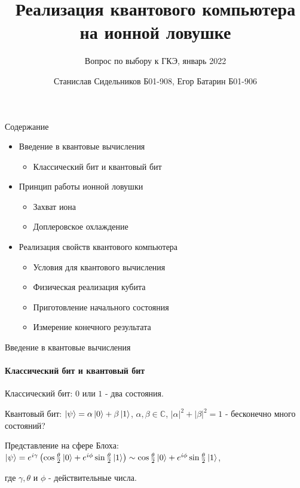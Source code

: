 \documentclass{beamer}
\title{Реализация квантового компьютера на ионной ловушке}
\subtitle{Вопрос по выбору к ГКЭ, январь 2022}
\author{Станислав Сидельников Б01-908, Егор Батарин Б01-906}
\institute{Московский физико-технический институт}
\date{}
\begin{document}
    
    \begin{frame}
        \titlepage
    \end{frame}

    \begin{frame}{Содержание}

        \begin{itemize}

            \item<1-> Введение в квантовые вычисления

                \begin{itemize}
                    \item Классический бит и квантовый бит
                \end{itemize}

            \item<2-> Принцип работы ионной ловушки

                \begin{itemize}
                    \item{Захват иона}
                    \item{Доплеровское охлаждение}
                \end{itemize}

            \item<3-> Реализация свойств квантового компьютера

                \begin{itemize}

                    \item{Условия для квантового вычисления}
                    \item{Физическая реализация кубита}
                    \item{Приготовление начального состояния}
                    \item{Измерение конечного результата}

                \end{itemize}

        \end{itemize}
    \end{frame}

	\begin{frame}{Введение в квантовые вычисления}
	\framesubtitle{Классический бит и квантовый бит}
	Классический бит: $0$ или $1$ - два состояния.
	\vspace{3mm}
	
	Квантовый бит: $\ket{\psi} = \alpha\ket{0} + \beta\ket{1}$, $\alpha,\beta \in \mathbb{C}$, $|\alpha|^2 + |\beta|^2 = 1$ - бесконечно много состояний?
	\vspace{3mm}
	
	Представление на сфере Блоха: $\ket{\psi} = e^{i\gamma}\left(  \cos{\frac{\theta}{2}}\ket{0}+e^{i\phi}\sin{\frac{\theta}{2}} \ket{1}  \right) \sim \cos{\frac{\theta}{2}}\ket{0}+e^{i\phi}\sin{\frac{\theta}{2}} \ket{1} $,
	
	где $\gamma, \theta$ и $\phi$ - действительные числа.
	\end{frame}
    
\end{document}
